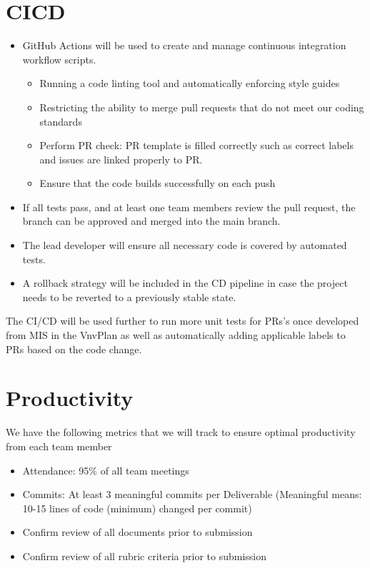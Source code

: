 \documentclass{article}
\begin{document}
\section{CICD}
\begin{itemize}
	\item GitHub Actions will be used to create and manage continuous integration workflow scripts.
	\begin{itemize}
    \item Running a code linting tool and automatically enforcing style guides
    \item Restricting the ability to merge pull requests that do not meet our coding standards
    \item Perform PR check: PR template is filled correctly such as correct labels and issues are linked properly to PR. 
    \item Ensure that the code builds successfully on each push
  \end{itemize}
	\item If all tests pass, and at least one team members review the pull request, the branch can be approved and merged 
    into the main branch.
	\item The lead developer will ensure all necessary code is covered by automated tests.
	\item A rollback strategy will be included in the CD pipeline in case the project needs 
  to be reverted to a previously stable state.
\end{itemize}

The CI/CD will be used further to run more unit tests for PRs's once developed from MIS in the VnvPlan 
as well as automatically adding applicable labels to PRs based on the code change. 

\section{Productivity}
We have the following metrics that we will track to ensure optimal productivity from each team member

\begin{itemize}
    \item Attendance: 95\% of all team meetings
    \item Commits: At least 3 meaningful commits per Deliverable (Meaningful means: 10-15 lines of code (minimum) changed per commit)
    \item Confirm review of all documents prior to submission
    \item Confirm review of all rubric criteria prior to submission
  \end{itemize}
\end{document}

